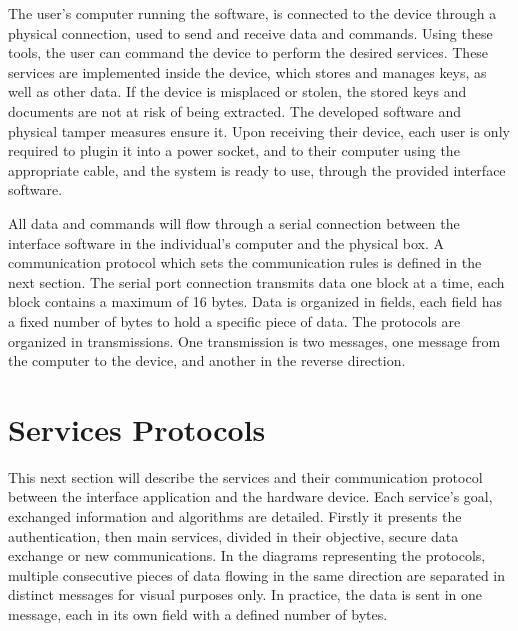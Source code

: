 The user's computer running the software, is connected to the device through a physical connection, used to send and receive data and commands.
Using these tools, the user can command the device to perform the desired services.
These services are implemented inside the device, which stores and manages keys, as well as other data.
If the device is misplaced or stolen, the stored keys and documents are not at risk of being extracted. The developed software and physical tamper measures ensure it.
Upon receiving their device, each user is only required to plugin it into a power socket, and to their computer using the appropriate cable, and the system is ready to use, through the provided interface software.

All data and commands will flow through a serial connection between the interface software in the individual's computer and the physical box. A communication protocol which sets the communication rules is defined in the next section.
The serial port connection transmits data one block at a time, each block contains a maximum of 16 bytes.
Data is organized in fields, each field has a fixed number of bytes to hold a specific piece of data.
The protocols are organized in transmissions. One transmission is two messages, one message from the computer to the device, and another in the reverse direction.

\section{Services Protocols}\label{chap:arch:services}

This next section will describe the services and their communication protocol between the interface application and the hardware device. Each service's goal, exchanged information and algorithms are detailed.
Firstly it presents the authentication, then main services, divided in their objective, secure data exchange or new communications. %
In the diagrams representing the protocols, multiple consecutive pieces of data flowing in the same direction are separated in distinct messages for visual purposes only. In practice, the data is sent in one message, each in its own field with a defined number of bytes.


